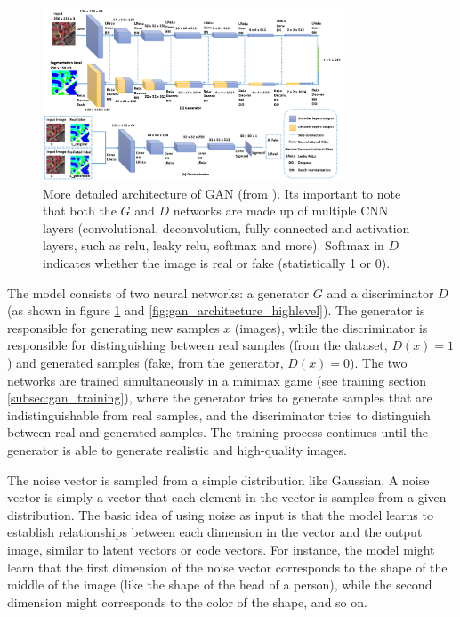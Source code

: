 \begin{figure}
    \centering
    \includegraphics[width=0.8\textwidth]{images/gan/gan_architecture.png}
    \caption{More detailed architecture of GAN (from \cite{gan_architecture_figure_paper}). Its important to note that both the $G$ and $D$ networks are made up of multiple CNN layers (convolutional, deconvolution, fully connected and activation layers, such as relu, leaky relu, softmax and more). Softmax in $D$ indicates whether the image is real or fake (statistically 1 or 0).}
    \label{fig:gan_architecture}
\end{figure}

The model consists of two neural networks: a generator $G$ and a discriminator $D$ (as shown in figure \ref{fig:gan_architecture} and \ref{fig:gan_architecture_highlevel}). The generator is responsible for generating new samples $x$ (images), while the discriminator is responsible for distinguishing between real samples (from the dataset, $D(x) = 1$) and generated samples (fake, from the generator, $D(x) = 0$). The two networks are trained simultaneously in a minimax game (see training section \ref{subsec:gan_training}), where the generator tries to generate samples that are indistinguishable from real samples, and the discriminator tries to distinguish between real and generated samples. The training process continues until the generator is able to generate realistic and high-quality images. 

The noise vector is sampled from a simple distribution like Gaussian. A noise vector is simply a vector that each element in the vector is samples from a given distribution. The basic idea of using noise as input is that the model learns to establish relationships between each dimension in the vector and the output image, similar to latent vectors or code vectors. For instance, the model might learn that the first dimension of the noise vector corresponds to the shape of the middle of the image (like the shape of the head of a person), while the second dimension might corresponds to the color of the shape, and so on.

